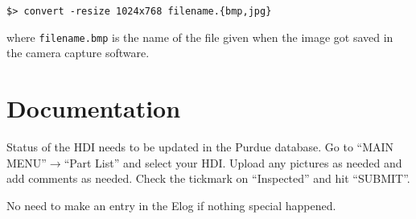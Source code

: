 \documentclass[12pt]{unlsilabsop}
\begin{document}
\medskip

\texttt{\$> convert -resize 1024x768 filename.\{bmp,jpg\}} 
\medskip

where \texttt{filename.bmp} is the name of the file given when the image got saved in the camera capture software.

\section{Documentation}
Status of the HDI needs to be updated in the Purdue database. Go to ``MAIN MENU''$\rightarrow$``Part List'' and select your HDI. Upload any pictures as needed and add comments as needed. Check the tickmark on ``Inspected'' and hit ``SUBMIT''. 

No need to make an entry in the Elog if nothing special happened.
\end{document}
